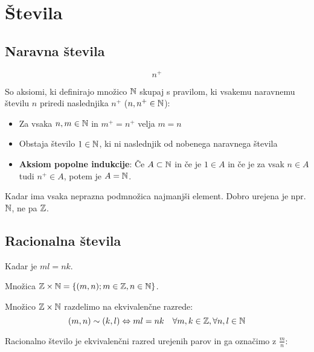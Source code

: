 \section{Števila}

\subsection{Naravna števila}


\[n^+\]


So aksiomi, ki definirajo množico $\mathbb{N}$ skupaj s pravilom, ki vsakemu naravnemu številu $n$ priredi naslednjika $n^+$ ($n, n^+ \in \mathbb{N}$):
\begin{itemize}
	\item Za vsaka $n, m \in \mathbb{N}$ in $m^+ = n^+$ velja $m=n$
	\item Obstaja število $1 \in \mathbb{N}$, ki ni naslednjik od nobenega naravnega števila
	\item \textbf{Aksiom popolne indukcije}: Če $A \subset \mathbb{N}$ in če je $1 \in A$ in če je za vsak $n \in A$ tudi $n^+ \in A$, potem je $A = \mathbb{N}$.
\end{itemize}


Kadar ima vsaka neprazna podmnožica najmanjši element. Dobro urejena je npr. $\mathbb{N}$, ne pa $\mathbb{Z}$.

\subsection{Racionalna števila}


Kadar je $ml = nk$.


Množica $\mathbb{Z} \times \mathbb{N} = \{(m, n); m \in \mathbb{Z}, n \in \mathbb{N} \}$.


Množico $\mathbb{Z} \times \mathbb{N}$ razdelimo na ekvivalenčne razrede:
\[
	(m, n) \sim (k, l) \Leftrightarrow ml = nk \quad \forall m, k \in \mathbb{Z}, \forall n, l \in \mathbb{N}
\]

Racionalno število je ekvivalenčni razred urejenih parov in ga označimo z $\frac{m}{n}$:

